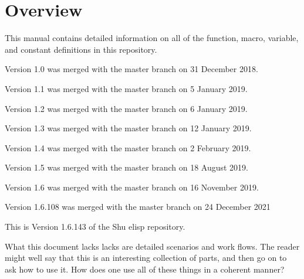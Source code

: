 




\section{Overview}


This manual contains detailed information on all of the function, macro,
variable, and constant definitions in this repository.

Version 1.0 was merged with the master branch on 31 December 2018.

Version 1.1 was merged with the master branch on 5 January 2019.

Version 1.2 was merged with the master branch on 6 January 2019.

Version 1.3 was merged with the master branch on 12 January 2019.

Version 1.4 was merged with the master branch on 2 February 2019.

Version 1.5 was merged with the master branch on 18 August 2019.

Version 1.6 was merged with the master branch on 16 November 2019.

Version 1.6.108 was merged with the master branch on 24 December 2021

This is Version 1.6.143 of the Shu elisp repository.

What this document lacks lacks are detailed scenarios and work flows.  The
reader might well say that this is an interesting collection of parts, and
then go on to ask how to use it.  How does one use all of these things in a
coherent manner?

